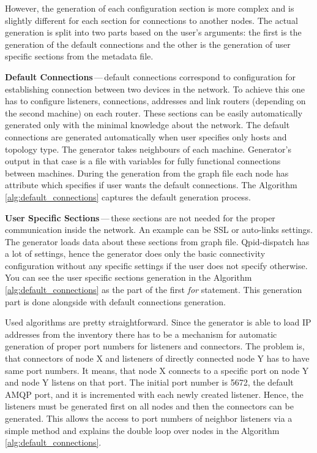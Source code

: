 However, the generation of each configuration section is more complex and is slightly different for each section for connections to another nodes. The actual generation is split into two parts based on the user's arguments: the first is the generation of the default connections and the other is the generation of user specific sections from the metadata file.

\begin{description}
	\item \textbf{Default Connections}\,---\,default connections correspond to configuration for establishing connection between two devices in the network. To achieve this one has to configure listeners, connections, addresses and link routers (depending on the second machine) on each router. These sections can be easily automatically generated only with the minimal knowledge about the network. The default connections are generated automatically when user specifies only hosts and topology type. The generator takes neighbours of each machine. Generator's output in that case is a file with variables for fully functional connections between machines. During the generation from the graph file each node has attribute which specifies if user wants the default connections. The Algorithm \ref{alg:default_connections} captures the default generation process.

	\item \textbf{User Specific Sections}\,---\,these sections are not needed for the proper communication inside the network. An example can be SSL or auto-links settings. The generator loads data about these sections from graph file. Qpid-dispatch has a lot of settings, hence the generator does only the basic connectivity configuration without any specific settings if the user does not specify otherwise. You can see the user specific sections generation in the Algorithm \ref{alg:default_connections} as the part of the first \emph{for} statement. This generation part is done alongside with default connections generation.

\end{description}

Used algorithms are pretty straightforward. Since the generator is able to load IP addresses from the inventory there has to be a mechanism for automatic generation of proper port numbers for listeners and connectors. The problem is, that connectors of node X and listeners of directly connected node Y has to have same port numbers. It means, that node X connects to a specific port on node Y and node Y listens on that port. The initial port number is 5672, the default AMQP port, and it is incremented with each newly created listener. Hence, the listeners must be generated first on all nodes and then the connectors can be generated. This allows the access to port numbers of neighbor listeners via a simple method and explains the double loop over nodes in the Algorithm \ref{alg:default_connections}.

